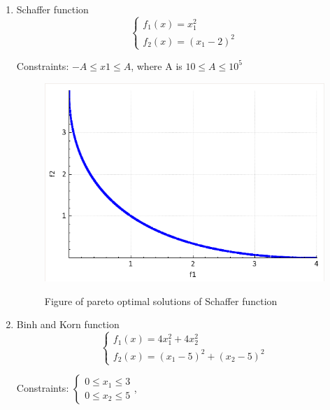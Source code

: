 \documentclass[11pt]{article}
\begin{document}
	\begin{enumerate}
	
	\item Schaffer function
	$$\begin{cases}
		f_{1}(x)=x_{1}^{2}\\
		f_{2}(x)=(x_{1}-2)^{2}
	\end{cases}$$
		
	Constraints: $-A \leq x1 \leq A$, where A is $10 \leq A \leq 10^{5}$
		
	\begin{figure}[H]
	\caption{Figure of pareto optimal solutions of Schaffer function}
	\centering
	\includegraphics[scale=0.4]{schaffer}
	\label{fig:schaffer}
	\end{figure}
	
	\item Binh and Korn function
	$$\begin{cases}
		f_{1}(x)=4x_{1}^{2}+4x_{2}^{2}\\
		f_{2}(x)=(x_{1}-5)^{2}+(x_{2}-5)^{2}
	\end{cases}$$
		
	Constraints:
	$\begin{cases}
		0 \leq x_{1} \leq 3\\
		0 \leq x_{2} \leq 5
	\end{cases}$,
	

\end{enumerate}
\end{document}
